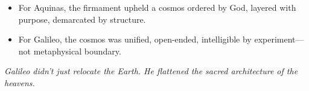 \begin{tcolorbox}[colback=gray!5, colframe=black, title=\textbf{Historical Sidebar: Aquinas, Galileo, and the Unraveling of the Firmament}, fonttitle=\bfseries, arc=1.5mm, boxrule=0.4pt]
    \begin{itemize}
      \item For Aquinas, the firmament upheld a cosmos ordered by God, layered with purpose, demarcated by structure.
      \item For Galileo, the cosmos was unified, open-ended, intelligible by experiment—not metaphysical boundary.
    \end{itemize}
    
    \begin{center}
    \emph{Galileo didn’t just relocate the Earth. He flattened the sacred architecture of the heavens.}
    \end{center}
    
\end{tcolorbox}
    


